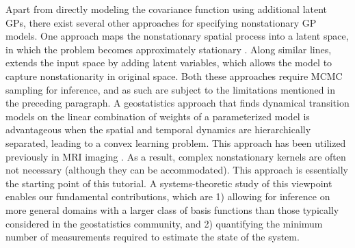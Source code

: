 Apart from directly modeling the covariance function using additional latent GPs, there exist several other approaches for specifying nonstationary GP models. One approach maps the nonstationary spatial process into a latent space, in which the problem becomes approximately stationary \cite{schmidt2003bayesian}. Along similar lines, \cite{pfingsten2006nonstationary} extends the input space by adding latent variables, which allows the model to capture  nonstationarity in original space. Both these approaches require MCMC sampling for inference, and as such are subject to the limitations mentioned in the preceding paragraph. 
A geostatistics approach that finds dynamical transition models on the linear combination of weights of a parameterized model \cite{cressie2011statistics,mardia1998kriged} is advantageous when the spatial and temporal dynamics are hierarchically separated, leading to a convex learning problem. This approach has been utilized previously in MRI imaging \cite{noh2007testing,noh2012space}. As a result, complex nonstationary kernels are often not necessary (although they can be accommodated). This approach is essentially the starting point of this tutorial. 
A systems-theoretic study of this viewpoint enables our fundamental contributions, which are 1) allowing for inference on more general domains with a larger class of basis functions than those typically considered in the geostatistics community, and 2) quantifying the minimum number of measurements required to estimate the state of the system. 

